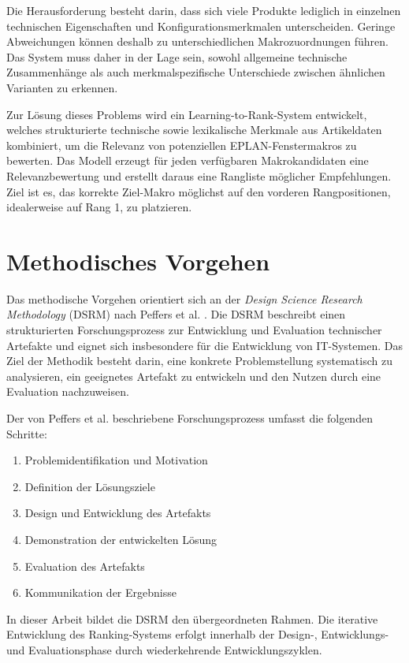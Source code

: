 Die Herausforderung besteht darin, dass sich viele Produkte lediglich in einzelnen technischen Eigenschaften und Konfigurationsmerkmalen unterscheiden. Geringe Abweichungen können deshalb zu unterschiedlichen Makrozuordnungen führen.
Das System muss daher in der Lage sein, sowohl allgemeine technische Zusammenhänge als auch merkmalspezifische Unterschiede zwischen ähnlichen Varianten zu erkennen.


Zur Lösung dieses Problems wird ein Learning-to-Rank-System entwickelt, welches strukturierte technische sowie lexikalische Merkmale aus Artikeldaten kombiniert, um die Relevanz von potenziellen EPLAN-Fenstermakros \parencite{EPLAN-Makros} zu bewerten. 
Das Modell erzeugt für jeden verfügbaren Makrokandidaten eine Relevanzbewertung und erstellt daraus eine Rangliste möglicher Empfehlungen. Ziel ist es, das korrekte Ziel-Makro möglichst auf den vorderen Rangpositionen, idealerweise auf Rang 1, zu platzieren.

\section{Methodisches Vorgehen}

Das methodische Vorgehen orientiert sich an der \textit{Design Science Research Methodology} (DSRM) nach Peffers et al. \citeyearpar{peffers2007dsrm}. 
Die DSRM beschreibt einen strukturierten Forschungsprozess zur Entwicklung und Evaluation technischer Artefakte und eignet sich insbesondere für die Entwicklung von IT-Systemen.
Das Ziel der Methodik besteht darin, eine konkrete Problemstellung systematisch zu analysieren, ein geeignetes Artefakt zu entwickeln und den Nutzen durch eine Evaluation nachzuweisen. 


Der von Peffers et al. beschriebene Forschungsprozess umfasst die folgenden Schritte: 

\begin{enumerate} 
    \item Problemidentifikation und Motivation 
    \item Definition der Lösungsziele 
    \item Design und Entwicklung des Artefakts 
    \item Demonstration der entwickelten Lösung 
    \item Evaluation des Artefakts 
    \item Kommunikation der Ergebnisse 
\end{enumerate} 

In dieser Arbeit bildet die DSRM den übergeordneten Rahmen. Die iterative Entwicklung des Ranking-Systems erfolgt innerhalb der Design-, Entwicklungs- und Evaluationsphase durch wiederkehrende Entwicklungszyklen. 


